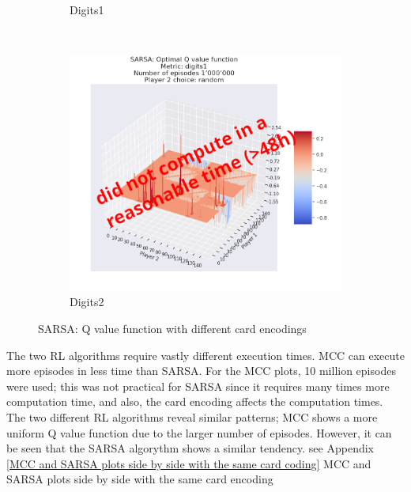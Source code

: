 \begin{figure}[ht!]
\begin{subfigure}{0.5\textwidth}
        \caption[Digits1]{Digits1}
        \label{fig:SARSAdigits1}
    \end{subfigure} \\
    \begin{subfigure}{0.5\textwidth}
        \includegraphics[width=1\linewidth]{Figures/SARSA_digits2_1000000_random}
        \caption[Digits2]{Digits2}
        \label{fig:SARSAdigits2}
    \end{subfigure}
    \caption{SARSA: Q value function with different card encodings}
\label{fig:SARSAl: Q value function with different card encodings}
\end{figure}



\newpage


The two RL algorithms require vastly different execution times. MCC can execute more episodes in less time than SARSA. For the MCC plots, 10 million episodes were used; this was not practical for SARSA since it requires many times more computation time, and also, the card encoding affects the computation times. \\

The two different RL algorithms reveal similar patterns; MCC shows a more uniform Q value function due to the larger number of episodes. However, it can be seen that the SARSA algorythm shows a similar tendency. see Appendix \ref{MCC and SARSA plots side by side with the same card coding} MCC and SARSA plots side by side with the same card encoding\\

